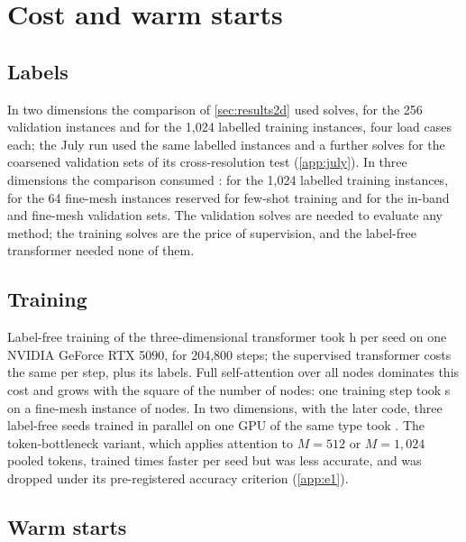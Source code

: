 \section{Cost and warm starts}\label{sec:cost}

\subsection{Labels}\label{sec:cost:labels}

In two dimensions the comparison of \cref{sec:results2d} used \numCmSolves{} solves,
\numCmSolvesVal{} for the 256 validation instances and \numCmSolvesTrain{} for the 1,024
labelled training instances, four load cases each; the July run used the same labelled
instances and a further \numTwoSolvesRun{} solves for the coarsened validation sets of its
cross-resolution test (\ref{app:july}). In three dimensions the comparison consumed
\numThreeSolves{}: \numThreeTrainSolves{} for the 1,024 labelled training instances,
\numThreeFewSolves{} for the 64 fine-mesh instances reserved for few-shot training and
\numThreeEvalSolves{} for the in-band and fine-mesh validation sets. The validation solves
are needed to evaluate any method; the training solves are the price of supervision, and
the label-free transformer needed none of them.

\subsection{Training}\label{sec:cost:training}

Label-free training of the three-dimensional transformer took \numTimeThreeSeed{} h per
seed on one NVIDIA GeForce RTX 5090, for 204,800 steps; the supervised transformer costs
the same per step, plus its labels. Full self-attention over all nodes dominates this cost
and grows with the square of the number of nodes: one training step took
\numEtwoTransformerFineStep{} s on a fine-mesh instance of \numEtwoNodesFine{} nodes. In
two dimensions, with the later code, three label-free seeds trained in parallel on one GPU
of the same type took \numTimeTwoParallel{}. The token-bottleneck variant, which applies
attention to $M=512$ or $M=1{,}024$ pooled tokens, trained \numTimeBottleneckSpeedup{}
times faster per seed but was less accurate, and was dropped under its pre-registered
accuracy criterion (\ref{app:e1}).

\subsection{Warm starts}\label{sec:cost:warm}

